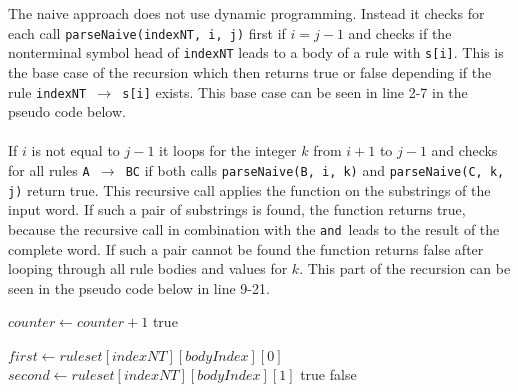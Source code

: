 \documentclass[a4paper, 11pt]{article}
\begin{document}
The naive approach does not use dynamic programming. Instead it checks for each call \texttt{parseNaive(indexNT, i, j)} first if $i = j-1$ and checks if the nonterminal symbol head of \texttt{indexNT} leads to a body of a rule with \texttt{s[i]}. This is the base case of the recursion which then returns true or false depending if the rule \texttt{indexNT $\rightarrow$  s[i]} exists. This base case can be seen in line 2-7 in the pseudo code below.
\\ 
\\
If $i$ is not equal to $j-1$ it loops for the integer $k$ from $i+1$ to $j-1$ and checks for all rules \texttt{A $\rightarrow$ BC} if both calls \texttt{parseNaive(B, i, k)} and \texttt{parseNaive(C, k, j)} return true. This recursive call applies the function on the substrings of the input word. If such a pair of substrings is found, the function returns true, because the recursive call in combination with the \grqq \texttt{and}\grqq \ leads to the result of the complete word. If such a pair cannot be found the function returns false after looping through all rule bodies and values for $k$. This part of the recursion can be seen in the pseudo code below in line 9-21.





\begin{center}
\label{alg:cap}
\begin{algorithmic}[1]
\State $counter \gets counter+1$
\State \Return true
\EndIf
\EndFor

\Else
{}
\State $first \gets ruleset[indexNT][bodyIndex][0]$
\State $second \gets ruleset[indexNT][bodyIndex][1]$
\State \Return true
\EndIf
\EndFor
\EndIf
\EndFor
\EndIf
\State \Return false
\end{algorithmic}
\hrulefill
\end{center}
\end{document}
